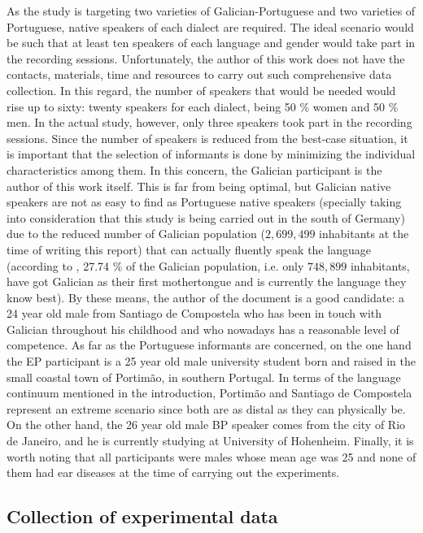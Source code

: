 \documentclass[a4paper,11pt]{article}
\begin{document}
    As the study is targeting two varieties of Galician-Portuguese and two varieties of Portuguese, native speakers of each dialect are required. The ideal scenario would be such that at least ten speakers of each language and gender would take part in the recording sessions. Unfortunately, the author of this work does not have the contacts, materials, time and resources to carry out such comprehensive data collection. In this regard, the number of speakers that would be needed would rise up to sixty: twenty speakers for each dialect, being 50 \% women and 50 \% men. In the actual study, however, only three speakers took part in the recording sessions. Since the number of speakers is reduced from the best-case situation, it is important that the selection of informants is done by minimizing the individual characteristics among them. In this concern, the Galician participant is the author of this work itself. This is far from being optimal, but Galician native speakers are not as easy to find as Portuguese native speakers (specially  taking into consideration that this study is being carried out in the south of Germany) due to the reduced number of Galician population ($2,699,499$ inhabitants \cite{ige} at the time of writing this report) that can actually fluently speak the language (according to \cite{persoas}, 27.74 \% of the Galician population, i.e. only $748,899$ inhabitants,  have got Galician as their first mothertongue and is currently the language they know best). By these means, the author of the document is a good candidate: a 24 year old male from Santiago de Compostela who has been in touch with Galician throughout his childhood and who nowadays has a reasonable level of competence. As far as the Portuguese informants are concerned, on the one hand the EP participant is a 25 year old male university student born and raised in the small coastal town of Portim\~ao, in southern Portugal. In terms of the language continuum mentioned in the introduction, Portim\~ao and Santiago de Compostela represent an extreme scenario since both are as distal  as they can physically be. On the other hand, the 26 year old male BP speaker comes from the city of Rio de Janeiro, and he is currently studying at University of Hohenheim. %
     Finally, it is worth noting that all participants were males whose mean age was 25 and none of them had ear diseases at the time of carrying out the experiments.
     
     \subsection{Collection of experimental data}
     
\end{document}
